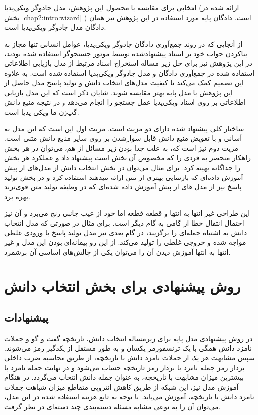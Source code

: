 انتخابی برای مقایسه با محصول این پژوهش، مدل جادوگر ویکی‌پدیا (ارائه شده در بخش 
\ref{chap2:intro:wizard}
)
است. دادگان پایه مورد استفاده در این پژوهش نیز همان دادگان مدل جادوگر ویکی‌پدیا است. 

از آنجایی که در روند جمع‌آوری دادگان جادوگر ویکی‌پدیا،‌ عوامل انسانی تنها مجاز به بناکردن جواب خود بر اسناد پیشنهاد‌شده توسط موتور جستجوگر استفاده شده بودند، در این پژوهش نیز
برای حل زیر مساله استخراج اسناد مرتبط
از مدل بازیابی اطلاعاتی 
استفاده شده در جمع‌آوری دادگان و مدل جادوگر ویکی‌پدیا استفاده شده است. به علاوه این تصمیم کمک می‌کند تا کیفیت مدل‌های انتخاب دانش و تولید پاسخ مدل حاصل از این پژوهش با مدل پایه بهتر مقایسه شوند. شایان ذکر است که این مدل بازیابی اطلاعاتی بر روی اسناد ویکی‌پدیا عمل جستجو را انجام می‌دهد و در نتیجه منبع دانش گپ‌زن ما ویکی پدیا است.

ساختار کلی پیشنهاد شده دارای دو مزیت است. مزیت اول این است که این مدل
به آسانی و با تعویض منبع دانش قابل سوارشدن بر روی سایر منابع دانش متنی است. مزیت دوم نیز است که، به علت جدا بودن زیر مسائل از هم، می‌توان در هر بخش راهکار منحصر به فردی را که مخصوص آن بخش است پیشنهاد داد و عملکرد هر بخش را جداگانه بهینه کرد. برای مثال می‌توان در بخش انتخاب دانش از مدل‌های از پیش آموزش داده‌ای که بازنمایی بهتری از متن ارائه میدهند استفاده کرد و در بخش تولید پاسخ نیز از مدل های از پیش آموزش داده شده‌ای که در وظیفه تولید متن قوی‌ترند بهره برد.

این طراحی غیر انتها به انتها و قطعه قطعه اما خود از عیب جانبی رنج می‌برد و آن نیز احتمال انتقال خطا از گامی به گام دیگر است. برای مثال در صورتی که مدل انتخاب دانش به اشتباه جمله‌ای را برگزیند، در گام بعدی نیز مدل تولید پاسخ با ورودی غلطی مواجه شده و خروجی غلطی را تولید می‌کند. از این رو پیمانه‌ای بودن این مدل و غیر انتها به انتها آموزش دیدن آن را می‌توان یکی از چالش‌های اساسی آن برشمرد.
\section{روش پیشنهادی برای بخش انتخاب دانش}

\subsection{پیشنهادات} \label{chap4:solution:recom}

در روش پیشنهادی مدل پایه برای زیرمساله انتخاب دانش، تاریخچه گفت و گو و جملات نامزد دانش همگی با یک ترنسفورمر یکسان و به طور مستقل از یکدگیر رمز می‌شوند. سپس مشابهت هر یک از جملات نامزد دانش با تاریخچه، از طریق محاسبه ضرب داخلی بردار رمز جمله نامزد با بردار رمز تاریخچه حساب می‌‌شود و در نهایت
جمله نامزد با بیشترین میزان مشابهت با تاریخچه، به عنوان جمله دانش انتخاب می‌گردد. در هنگام آموزش مدل نیز،‌ این شبکه از طریق کاهش انتروپی متقاطع میزان شباهت جملات نامزد دانش با تاریخچه، آموزش می‌یابد. با توجه به تابع هزینه استفاده شده در این مدل، می‌توان آن را به نوعی مشابه مسئله دسته‌بندی چند دسته‌ای در نظر گرفت. 

